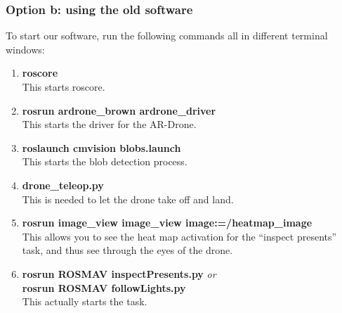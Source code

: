 \documentclass[a4paper,10pt]{article}
\begin{document}
\subsubsection{Option b: using the old software}
To start our software, run the following commands all in different terminal windows:
\begin{enumerate}
\item \textbf{roscore} \\ This starts roscore.
\item \textbf{rosrun ardrone\_brown ardrone\_driver} \\ This starts the driver for the AR-Drone.
\item \textbf{roslaunch cmvision blobs.launch} \\ This starts the blob detection process.
\item \textbf{drone\_teleop.py} \\ This is needed to let the drone take off and land.
\item \textbf{rosrun image\_view image\_view image:=/heatmap\_image} \\ This
      allows you to see the heat map activation for the ``inspect presents''
      task, and thus see through the eyes of the drone.
\item \textbf{rosrun ROSMAV inspectPresents.py} \textit{or} \\
      \textbf{rosrun ROSMAV followLights.py} \\
      This actually starts the task. 
\end{enumerate}
\
\end{document}
